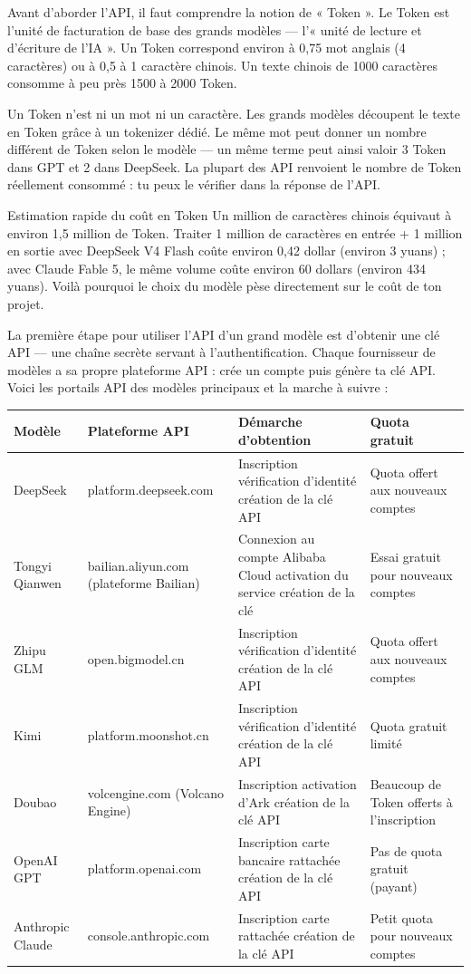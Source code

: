 
Avant d'aborder l'API, il faut comprendre la notion de « Token ». Le Token est l'unité de facturation de base des grands modèles — l'« unité de lecture et d'écriture de l'IA ». Un Token correspond environ à 0,75 mot anglais (4 caractères) ou à 0,5 à 1 caractère chinois. Un texte chinois de 1000 caractères consomme à peu près 1500 à 2000 Token.

Un Token n'est ni un mot ni un caractère. Les grands modèles découpent le texte en Token grâce à un tokenizer dédié. Le même mot peut donner un nombre différent de Token selon le modèle — un même terme peut ainsi valoir 3 Token dans GPT et 2 dans DeepSeek. La plupart des API renvoient le nombre de Token réellement consommé : tu peux le vérifier dans la réponse de l'API.

\begin{tcbinfo}{Estimation rapide du coût en Token}
Un million de caractères chinois équivaut à environ 1,5 million de Token. Traiter 1 million de caractères en entrée + 1 million en sortie avec DeepSeek V4 Flash coûte environ 0,42 dollar (environ 3 yuans) ; avec Claude Fable 5, le même volume coûte environ 60 dollars (environ 434 yuans). Voilà pourquoi le choix du modèle pèse directement sur le coût de ton projet.

\end{tcbinfo}


La première étape pour utiliser l'API d'un grand modèle est d'obtenir une clé API — une chaîne secrète servant à l'authentification. Chaque fournisseur de modèles a sa propre plateforme API : crée un compte puis génère ta clé API. Voici les portails API des modèles principaux et la marche à suivre :

\begin{center}
\begin{tabularx}{\linewidth}{|X|X|X|X|}
\hline
\textbf{Modèle} & \textbf{Plateforme API} & \textbf{Démarche d'obtention} & \textbf{Quota gratuit} \tabularnewline
\hline
DeepSeek & platform.deepseek.com & Inscription vérification d'identité création de la clé API & Quota offert aux nouveaux comptes \tabularnewline
Tongyi Qianwen & bailian.aliyun.com (plateforme Bailian) & Connexion au compte Alibaba Cloud activation du service création de la clé & Essai gratuit pour nouveaux comptes \tabularnewline
Zhipu GLM & open.bigmodel.cn & Inscription vérification d'identité création de la clé API & Quota offert aux nouveaux comptes \tabularnewline
Kimi & platform.moonshot.cn & Inscription vérification d'identité création de la clé API & Quota gratuit limité \tabularnewline
Doubao & volcengine.com (Volcano Engine) & Inscription activation d'Ark création de la clé API & Beaucoup de Token offerts à l'inscription \tabularnewline
OpenAI GPT & platform.openai.com & Inscription carte bancaire rattachée création de la clé API & Pas de quota gratuit (payant) \tabularnewline
Anthropic Claude & console.anthropic.com & Inscription carte rattachée création de la clé API & Petit quota pour nouveaux comptes \tabularnewline
\hline
\end{tabularx}
\end{center}

